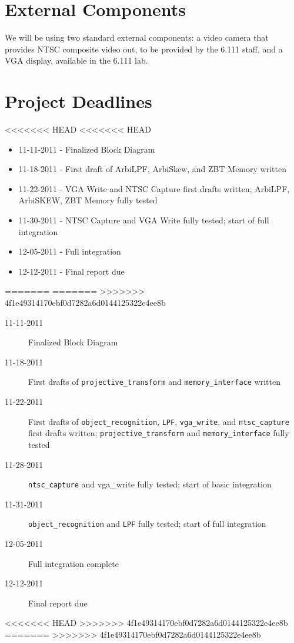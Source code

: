 \documentclass[10pt]{article}
\begin{document}
\section{External Components}
We will be using two standard external components: a video camera that provides NTSC composite video out, to be provided by the 6.111 staff, and a VGA display, available in the 6.111 lab.

\section{Project Deadlines}
<<<<<<< HEAD
<<<<<<< HEAD
\begin{itemize}
\item[] 11-11-2011 - Finalized Block Diagram
\item[] 11-18-2011 - First draft of ArbiLPF, ArbiSkew, and ZBT Memory written
\item[] 11-22-2011 - VGA Write and NTSC Capture first drafts written; ArbiLPF, ArbiSKEW, ZBT Memory fully tested
\item[] 11-30-2011 - NTSC Capture and VGA Write fully tested; start of full integration
\item[] 12-05-2011 - Full integration
\item[] 12-12-2011 - Final report due
\end{itemize}
=======
=======
>>>>>>> 4f1e49314170ebf0d7282a6d0144125322e4ee8b
\begin{description}
\item[11-11-2011] Finalized Block Diagram
\item[11-18-2011] First drafts of {\tt projective\_transform} and {\tt memory\_interface} written
\item[11-22-2011] First drafts of {\tt object\_recognition}, {\tt LPF}, {\tt vga\_write}, and {\tt ntsc\_capture} first drafts written; {\tt projective\_transform} and {\tt memory\_interface} fully tested
\item[11-28-2011] {\tt ntsc\_capture} and {vga\_write} fully tested; start of basic integration
\item[11-31-2011] {\tt object\_recognition} and {\tt LPF} fully tested; start of full integration
\item[12-05-2011] Full integration complete
\item[12-12-2011] Final report due
\end{description}
<<<<<<< HEAD
>>>>>>> 4f1e49314170ebf0d7282a6d0144125322e4ee8b
=======
>>>>>>> 4f1e49314170ebf0d7282a6d0144125322e4ee8b
\end{document}

